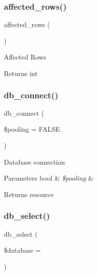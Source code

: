 \subsubsection{\texorpdfstring{affected\+\_\+rows()}{affected\_rows()}}
{\footnotesize\ttfamily affected\+\_\+rows (\begin{DoxyParamCaption}{ }\end{DoxyParamCaption})}

Affected Rows

\begin{DoxyReturn}{Returns}
int 
\end{DoxyReturn}
\mbox{\label{class_c_i___d_b__sqlsrv__driver_a6d26c8c9642181bd1124a45342f669f7}} 
\subsubsection{\texorpdfstring{db\+\_\+connect()}{db\_connect()}}
{\footnotesize\ttfamily db\+\_\+connect (\begin{DoxyParamCaption}\item[{}]{\$pooling = {\ttfamily FALSE} }\end{DoxyParamCaption})}

Database connection


\begin{DoxyParams}[1]{Parameters}
bool & {\em \$pooling} & \\
\hline
\end{DoxyParams}
\begin{DoxyReturn}{Returns}
resource 
\end{DoxyReturn}
\mbox{\label{class_c_i___d_b__sqlsrv__driver_a18ae9c21870b30b45337c5e3626190cc}} 
\subsubsection{\texorpdfstring{db\+\_\+select()}{db\_select()}}
{\footnotesize\ttfamily db\+\_\+select (\begin{DoxyParamCaption}\item[{}]{\$database = {\ttfamily \textquotesingle{}\textquotesingle{}} }\end{DoxyParamCaption})}

